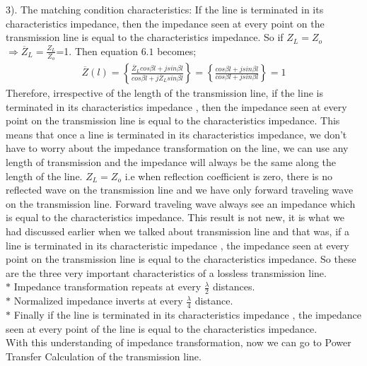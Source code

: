  3). The matching condition characteristics: If the line is terminated in its characteristics impedance, then the impedance seen at every point on the transmission line is equal to the characteristics impedance. So if $Z_L=Z_o$ $\Longrightarrow \overline{Z}_L= \frac{Z_L}{Z_o}$=1. Then equation $6.1$ becomes;
 \begin{align*}
 \overline{Z}(l) = \left\lbrace \frac{\overline{Z}_Lcos\beta l + jsin\beta l}{cos\beta l + j\overline{Z}_Lsin\beta l}\right\rbrace = \left\lbrace \frac{cos\beta l + jsin\beta l}{cos\beta l + jsin\beta l}\right\rbrace = 1
  \end{align*}
  Therefore, irrespective of the length of the transmission line, if the line is terminated in its characteristics impedance , then the impedance seen at every point on the transmission line is equal to the characteristics impedance. This means that once a line is terminated in its characteristics impedance, we don't have to worry about the impedance transformation on the line, we can use any length of transmission and the impedance will always be the same along the length of the line. $Z_L=Z_o$ i.e when reflection coefficient is zero, there is no reflected wave on the transmission line and we have only forward traveling wave on the transmission line. Forward traveling wave always see an impedance which is equal to the characteristics impedance. This result is not new, it is what we had discussed earlier when we talked about transmission line and that was, if a line is terminated in its characteristic impedance , the impedance seen at every point on the transmission line is equal to the characteristics impedance. So these are the three very important characteristics of a lossless transmission line. \\
  
  $\ast$ Impedance transformation repeats at every $\frac{\lambda}{2}$ distances.\\
  
  $\ast$ Normalized impedance inverts at every $\frac{\lambda}{4}$ distance.\\
  
  $\ast$ Finally if the line is terminated in its characteristics impedance , the impedance seen at every point of the line is equal to the characteristics impedance.
 \\
 
 With this understanding of impedance transformation, now we can go to Power Transfer Calculation of the transmission line.\\
 
